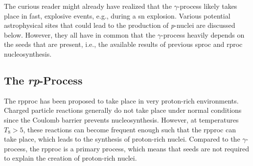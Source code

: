 
The curious reader might already have realized that the $\gamma$-process likely takes place in fast, explosive events, e.g., during a \ac{sn} explosion. Various potential astrophysical sites that could lead to the production of \textit{p}-nuclei are discussed below. However, they all have in common that the $\gamma$-process heavily depends on the seeds that are present, i.e., the available results of previous \ac{sproc} and \ac{rproc} nucleosynthesis. 


\subsection{The \textit{rp}-Process}

The \acf{rpproc} has been proposed to take place in very proton-rich environments. Charged particle reactions generally do not take place under normal conditions since the Coulomb barrier prevents nucleosynthesis. However, at temperatures $T_8 > 5$, these reactions can become frequent enough such that the \ac{rpproc} can take place, which leads to the synthesis of proton-rich nuclei.  Compared to the $\gamma$-process, the \ac{rpproc} is a primary process, which means that seeds are not required to explain the creation of proton-rich nuclei.

